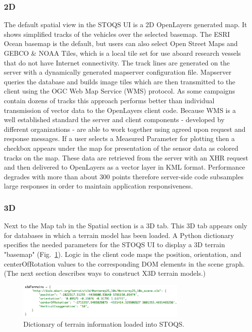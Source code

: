 \documentclass[conference]{IEEEtran}
\begin{document}
\subsubsection{2D}
The default spatial view in the STOQS UI is a 2D OpenLayers generated map. It shows simplified tracks of the vehicles over the selected basemap. The ESRI Ocean basemap is the default, but users can also select Open Street Maps and GEBCO \& NOAA Tiles, which is a local tile set for use aboard research vessels that do not have Internet connectivity. The track lines are generated on the server with a dynamically generated mapserver configuration file. Mapserver queries the database and builds image tiles which are then transmitted to the client using the OGC Web Map Service (WMS) protocol. As some campaigns contain dozens of tracks this approach performs better than individual transmission of vector data to the OpenLayers client code. Because WMS is a well established standard the server and client components - developed by different organizations - are able to work together using agreed upon request and response messages. If a user selects a Measured Parameter for plotting then a checkbox appears under the map for presentation of the sensor data as colored tracks on the map. These data are retrieved from the server with an XHR request and then delivered to OpenLayers as a vector layer in KML format. Performance degrades with more than about 300 points therefore server-side code subsamples large responses in order to maintain application responsiveness.

\subsubsection{3D}
Next to the Map tab in the Spatial section is a 3D tab. This 3D tab appears only for databases in which a terrain model has been loaded. A Python dictionary specifies the needed parameters for the STOQS UI to display a 3D terrain "basemap" (Fig.~\ref{fig:x3dTerrains}). Logic in the client code maps the position, orientation, and centerOfRotation values to the corresponding DOM elements in the scene graph. (The next section describes ways to construct X3D terrain models.)

\begin{figure}[htbp]
\centering
\includegraphics[width=3.3in]{x3dTerrains.png}
\caption{Dictionary of terrain information loaded into STOQS.}
\label{fig:x3dTerrains}
\end{figure}
\end{document}
